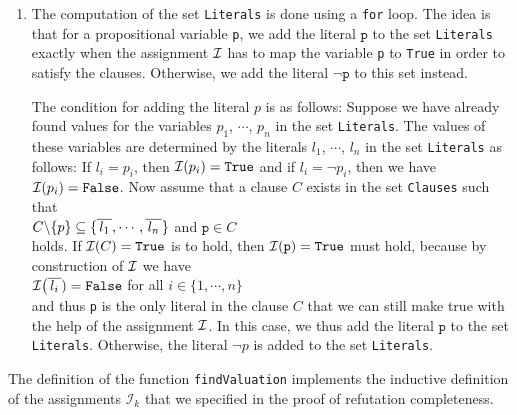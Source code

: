 \begin{enumerate}
\begin{enumerate}
      \end{enumerate}
\item The computation of the set \texttt{Literals} is done using a \texttt{for} loop.
      The idea is that for a propositional variable \texttt{p}, we add the literal
      $\texttt{p}$ to the set \texttt{Literals} exactly when the assignment $\mathcal{I}$ has to map the variable \texttt{p}
      to \texttt{True} in order to satisfy the clauses. Otherwise, we add
      the literal $\neg\texttt{p}$ to this set instead.

      The condition for adding the literal $p$ is as follows:
      Suppose we have already found values for the variables
      $p_1$, $\cdots$, $p_n$ in the set \texttt{Literals}.
      The values of these variables are determined by the literals $l_1$, $\cdots$, $l_n$ in the set \texttt{Literals}
      as follows: If $l_i = p_i$, then $\mathcal{I}(p_i) = \texttt{True}$
      and if $l_i = \neg p_i$, then we have $\mathcal{I}(p_i) = \texttt{False}$.
      Now assume that a clause $C$ exists in the set \texttt{Clauses} such that
      \\[0.2cm]
      \hspace*{1.3cm}
      $C \backslash \{p\} \subseteq \{ \overline{\,l_1\,}, \cdots, \overline{\,l_n\,} \}$ \quad and \quad $\texttt{p} \in C$
      \\[0.2cm]
      holds. If $\mathcal{I}(C) = \texttt{True}$ is to hold, then $\mathcal{I}(\texttt{p}) = \texttt{True}$ must hold, because
      by construction of $\mathcal{I}$ we have
      \\[0.2cm]
      \hspace*{1.3cm}
      $\mathcal{I}\bigl(\overline{\,l_i\,}) = \texttt{False}$ \quad for all $i \in \{1,\cdots,n\}$
      \\[0.2cm]
      and thus \texttt{p} is the only literal in the clause $C$ that we can still make true with the help of the assignment $\mathcal{I}$. In this case, we thus add the literal
      $\texttt{p}$ to the set \texttt{Literals}. Otherwise, the literal $\neg p$ is added to the set
      \texttt{Literals}.
\end{enumerate}
The definition of the function \texttt{findValuation} implements the inductive definition of the assignments
$\mathcal{I}_k$ that we specified in the proof of refutation completeness.


